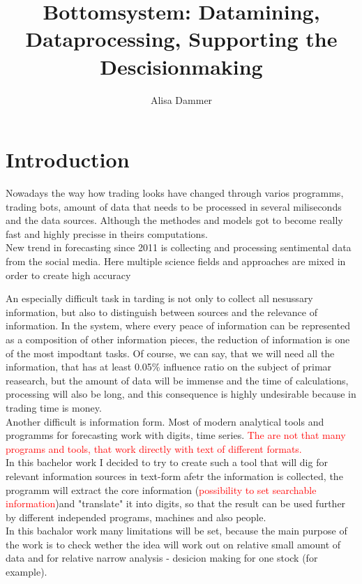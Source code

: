 \documentclass[11pt]{article}
\title{\textbf{Bottomsystem: Datamining, Dataprocessing, Supporting the Descisionmaking}}
\author{Alisa Dammer}
\begin{document}
\maketitle

\section{Introduction}
Nowadays the way how trading looks have changed through varios programms, trading bots, amount of data that needs to be processed in several miliseconds and the data sources. Although the methodes and models got to become really fast and highly precisse in theirs computations.\\
New trend in forecasting since 2011 is collecting and processing sentimental data from the social media. Here multiple science fields and approaches are mixed in order to create high accuracy 
 
An especially difficult task in tarding is not only to collect all nesussary information, but also to distinguish between sources and the relevance of information. In the system, where every peace of information can be represented as a composition of other information pieces, the reduction of information is one of the most impodtant tasks. Of course, we can say, that we will need all the information, that has at least 0.05\% influence ratio on the subject of primar reasearch, but the amount of data will be immense and the time of calculations, processing will also be long, and this consequence is highly undesirable because in trading time is money.\\
Another difficult is information form. Most of modern analytical tools and programms for forecasting work with digits, time series.
\textcolor{red}{The are not that many programs and tools, that work directly with text of different formats.}\\

In this bachelor work I decided to try to create such a tool that will dig for relevant information sources in text-form afetr the information is collected, the programm will extract the core information (\textcolor{red}{possibility to set searchable information})and "translate" it into digits, so that the result can be used further by different independed programs, machines and also people.\\
In this bachalor work many limitations will be set, because the main purpose of the work is to check wether the idea will work out on relative small amount of data and for relative narrow analysis - desicion making for one stock (for example). 
\newpage
\end{document}
